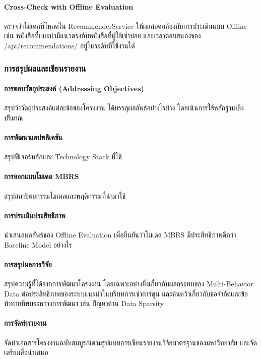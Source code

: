 \paragraph{Cross-Check with Offline Evaluation}
ตรวจว่าโมเดลที่โหลดใน RecommenderService ให้ผลสอดคล้องกับการประเมินแบบ Offline เช่น หนังสือที่แนะนำมีแนวตรงกับหนังสือที่ผู้ใช้เช่าบ่อย และเวลาตอบสนองของ /api/recommendations/ อยู่ในระดับที่ใช้งานได้

\subsubsection{การสรุปผลและเขียนรายงาน}

\paragraph{การตอบวัตถุประสงค์ (Addressing Objectives)}
สรุปว่าวัตถุประสงค์แต่ละข้อของโครงงาน ได้บรรลุผลลัพธ์อย่างไรบ้าง โดยเน้นการใช้หลักฐานเชิงปริมาณ

\paragraph{การพัฒนาแอปพลิเคชัน}
สรุปฟีเจอร์หลักและ Technology Stack ที่ใช้
\paragraph{การออกแบบโมเดล MBRS}
สรุปสถาปัตยกรรมโมเดลและพฤติกรรมที่นำมาใช้
\paragraph{การประเมินประสิทธิภาพ}
นำเสนอผลลัพธ์ของ Offline Evaluation เพื่อยืนยันว่าโมเดล MBRS มีประสิทธิภาพดีกว่า Baseline Model อย่างไร

\paragraph{การสรุปผลการวิจัย}
สรุปความรู้ที่ได้จากการพัฒนาโครงงาน โดยเฉพาะอย่างยิ่งเกี่ยวกับผลกระทบของ Multi-Behavior Data ต่อประสิทธิภาพของระบบแนะนำในบริบทการเช่าการ์ตูน และค้นคว้าเกี่ยวกับข้อจำกัดและข้อท้าทายที่พบระหว่างการพัฒนา เช่น ปัญหาด้าน Data Sparsity

\paragraph{การจัดทำรายงาน}
จัดทำเอกสารโครงงานฉบับสมบูรณ์ตามรูปแบบการเขียนรายงานวิจัยมาตรฐานของมหาวิทยาลัย และจัดเตรียมสื่อนำเสนอ 

